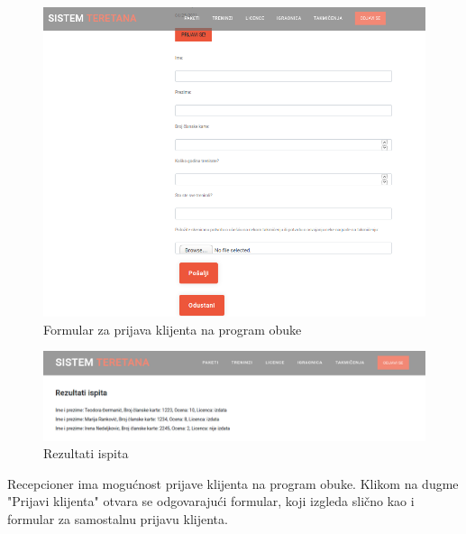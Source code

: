 \begin{figure}[!ht]
\begin{center}
\includegraphics[scale=0.45]{sections/korisnicki_interfejs/screenshots/licenca-klijent-prijava.png}
\end{center}
\caption{Formular za prijava klijenta na program obuke}
\label{fig:licenca_klijent_prijava}
\end{figure}

\begin{figure}[!ht]
\begin{center}
\includegraphics[scale=0.25]{sections/korisnicki_interfejs/screenshots/licenca-klijent-ispiti.png}
\end{center}
\caption{Rezultati ispita}
\label{fig:licenca_klijent_ispiti}
\end{figure}


Recepcioner ima mogućnost prijave klijenta na program obuke. Klikom na dugme "Prijavi klijenta" otvara se odgovarajući formular, koji izgleda slično kao i formular za samostalnu prijavu klijenta.